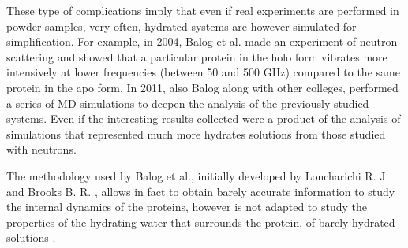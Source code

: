 These type of complications imply that even if real experiments are performed in powder samples, very often, hydrated systems are however simulated for simplification. For example, in 2004, Balog et al. made an experiment of neutron scattering and showed that a particular protein in the holo form vibrates more intensively at lower frequencies (between 50 and 500 GHz) compared to the same protein in the apo form.
In 2011, also Balog along with other colleges, performed a series of MD simulations to deepen the analysis of the previously studied systems. Even if the interesting results collected were a product of the analysis of simulations that represented much more hydrates solutions from those studied with neutrons.

The methodology used by Balog et al., initially developed by Loncharichi R. J. and Brooks B. R. \cite{loncharich1990temperature}, allows in fact to obtain barely accurate information to study the internal dynamics of the proteins, however is not adapted to study the properties of the hydrating water that surrounds the protein, of barely hydrated solutions \cite{tarek2000dynamics}.

